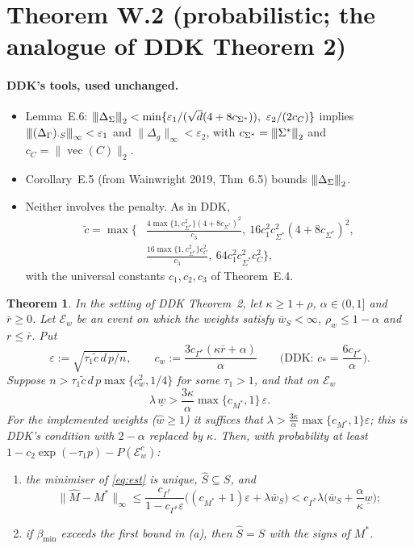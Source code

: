 \documentclass[11pt,a4paper]{article}
\numberwithin{equation}{section}
\theoremstyle{plain}
\newtheorem{theorem}{Theorem}
\theoremstyle{remark}
\newcommand{\opnorm}[1]{{\vert\kern-0.25ex\vert\kern-0.25ex\vert #1 \vert\kern-0.25ex\vert\kern-0.25ex\vert}}
\DeclareMathOperator{\vect}{vec}
\begin{document}
\section{Theorem W.2 (probabilistic; the analogue of DDK Theorem 2)}\label{sec:W2}

\paragraph{DDK's tools, used unchanged.}
\begin{itemize}
  \item Lemma~E.6: $\opnorm{\Delta_\Sigma}_2<\min\{\varepsilon_1/(\sqrt d(4+8c_{\Sigma^*})),\ \varepsilon_2/(2c_C)\}$ implies $\opnorm{(\Delta_\Gamma)_{\cdot S}}_\infty<\varepsilon_1$ and $\|\Delta_g\|_\infty<\varepsilon_2$, with $c_{\Sigma^*}=\opnorm{\Sigma^*}_2$ and $c_C=\|\vect(C)\|_2$.
  \item Corollary~E.5 (from Wainwright 2019, Thm~6.5) bounds $\opnorm{\Delta_\Sigma}_2$.
  \item Neither involves the penalty. As in DDK,
  \[
  \begin{split}
  \tilde c=\max\Big\{&\frac{4\max\{1,c_{\Sigma^*}^2\}(4+8c_{\Sigma^*})^2}{c_3},\ 16c_1^2c_{\Sigma^*}^2(4+8c_{\Sigma^*})^2,\\
  &\frac{16\max\{1,c_{\Sigma^*}^2\}c_C^2}{c_3},\ 64c_1^2c_{\Sigma^*}^2c_C^2\Big\},
  \end{split}
  \]
  with the universal constants $c_1,c_2,c_3$ of Theorem~E.4.
\end{itemize}

\begin{theorem}\label{thm:W2}
In the setting of DDK Theorem~2, let $\kappa\ge1+\rho$, $\alpha\in(0,1]$ and $\bar r\ge0$. Let $\mathcal E_w$ be an event on which the weights satisfy $\bar w_S<\infty$, $\rho_w\le1-\alpha$ and $r\le\bar r$. Put
\[
\varepsilon:=\sqrt{\tau_1\tilde c\,d\,p/n},\qquad c_w:=\frac{3c_{\Gamma^*}(\kappa\bar r+\alpha)}{\alpha}\qquad\Big(\text{DDK: }c_*=\frac{6c_{\Gamma^*}}{\alpha}\Big).
\]
Suppose $n>\tau_1\tilde c\,d\,p\max\{c_w^2,1/4\}$ for some $\tau_1>1$, and that on $\mathcal E_w$
\[
\lambda\,\underline w>\frac{3\kappa}{\alpha}\max\{c_{M^*},1\}\,\varepsilon .
\]
For the implemented weights ($\hat w\ge1$) it suffices that $\lambda>\frac{3\kappa}{\alpha}\max\{c_{M^*},1\}\varepsilon$; this is DDK's condition with $2-\alpha$ replaced by $\kappa$. Then, with probability at least $1-c_2\exp(-\tau_1p)-P(\mathcal E_w^c)$:
\begin{enumerate}[label=\upshape(\alph*)]
  \item the minimiser of \eqref{eq:est} is unique, $\hat S\subseteq S$, and
  \[
  \|\hat M-M^*\|_\infty\le\frac{c_{\Gamma^*}}{1-c_{\Gamma^*}\varepsilon}\big((c_{M^*}+1)\varepsilon+\lambda\bar w_S\big)<c_{\Gamma^*}\lambda\Big(\bar w_S+\frac\alpha\kappa\underline w\Big);
  \]
  \item if $\beta_{\min}$ exceeds the first bound in (a), then $\hat S=S$ with the signs of $M^*$.
\end{enumerate}
\end{theorem}
\end{document}
